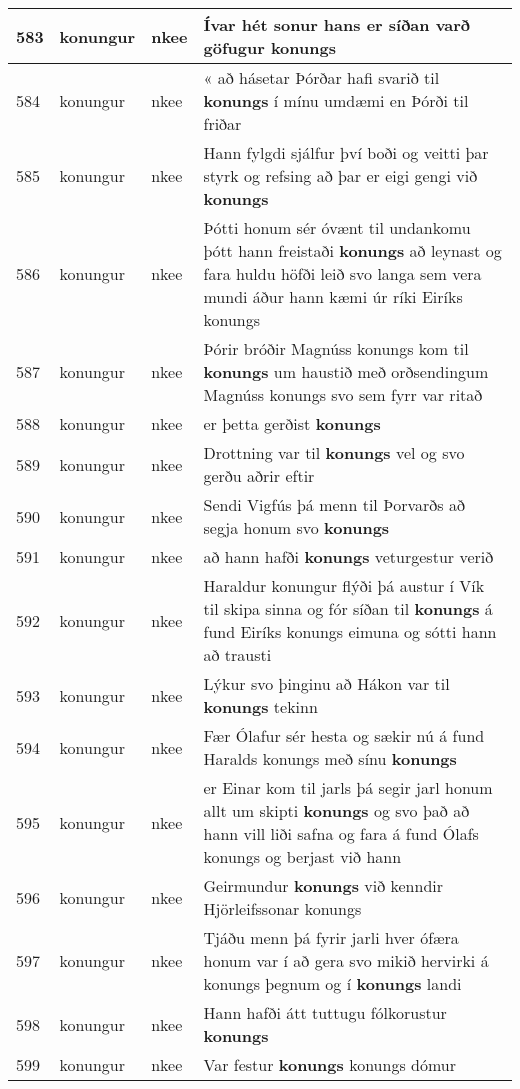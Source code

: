 \documentclass{article}
\begin{document}
\begin{longtable}{p{1cm}|p{1cm}|p{1cm}|p{13cm}}
\hline
583&konungur&nkee&Ívar hét sonur hans er síðan varð göfugur \textbf{konungs} \\
\hline
584&konungur&nkee&« að hásetar Þórðar hafi svarið til \textbf{konungs} í mínu umdæmi en Þórði til friðar\\
\hline
585&konungur&nkee&Hann fylgdi sjálfur því boði og veitti þar styrk og refsing að þar er eigi gengi við \textbf{konungs} \\
\hline
586&konungur&nkee&Þótti honum sér óvænt til undankomu þótt hann freistaði \textbf{konungs} að leynast og fara huldu höfði leið svo langa sem vera mundi áður hann kæmi úr ríki Eiríks konungs\\
\hline
587&konungur&nkee&Þórir bróðir Magnúss konungs kom til \textbf{konungs} um haustið með orðsendingum Magnúss konungs svo sem fyrr var ritað\\
\hline
588&konungur&nkee&er þetta gerðist \textbf{konungs} \\
\hline
589&konungur&nkee&Drottning var til \textbf{konungs} vel og svo gerðu aðrir eftir\\
\hline
590&konungur&nkee&Sendi Vigfús þá menn til Þorvarðs að segja honum svo \textbf{konungs} \\
\hline
591&konungur&nkee&að hann hafði \textbf{konungs} veturgestur verið\\
\hline
592&konungur&nkee&Haraldur konungur flýði þá austur í Vík til skipa sinna og fór síðan til \textbf{konungs} á fund Eiríks konungs eimuna og sótti hann að trausti\\
\hline
593&konungur&nkee&Lýkur svo þinginu að Hákon var til \textbf{konungs} tekinn\\
\hline
594&konungur&nkee&Fær Ólafur sér hesta og sækir nú á fund Haralds konungs með sínu \textbf{konungs} \\
\hline
595&konungur&nkee&er Einar kom til jarls þá segir jarl honum allt um skipti \textbf{konungs} og svo það að hann vill liði safna og fara á fund Ólafs konungs og berjast við hann\\
\hline
596&konungur&nkee&Geirmundur \textbf{konungs} við kenndir Hjörleifssonar konungs\\
\hline
597&konungur&nkee&Tjáðu menn þá fyrir jarli hver ófæra honum var í að gera svo mikið hervirki á konungs þegnum og í \textbf{konungs} landi\\
\hline
598&konungur&nkee&Hann hafði átt tuttugu fólkorustur \textbf{konungs} \\
\hline
599&konungur&nkee&Var festur \textbf{konungs} konungs dómur\\

\end{longtable}
\end{document}
